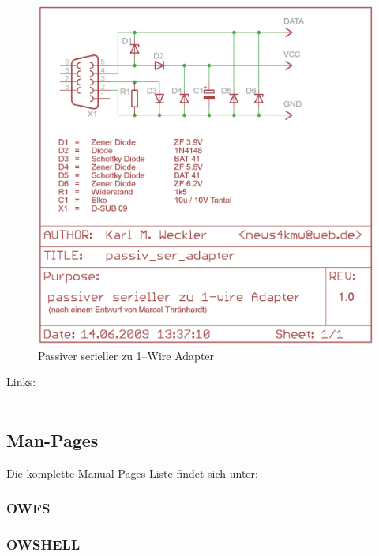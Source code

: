 \begin{figure}[htbp]
  \centering
  \includegraphics[width=\columnwidth]{passiv_ser_adapter}
  \caption{Passiver serieller zu 1--Wire Adapter}
  \label{fig:passiv_ser_adapter}
\end{figure}

Links:\\
 \\

\newpage

{
\subsection{Man-Pages}
}
Die komplette Manual Pages Liste findet sich unter:


\subsubsection{OWFS}



\subsubsection{OWSHELL}

